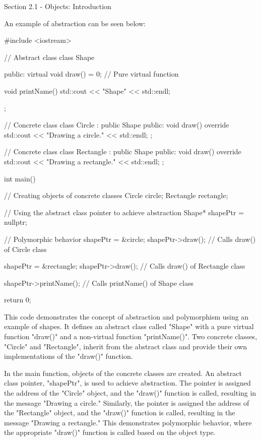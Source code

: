 \begin{notes}{Section 2.1 - Objects: Introduction}
    \begin{highlight}
        An example of abstraction can be seen below:
    \begin{code}[C++]
    #include <iostream>

    // Abstract class
    class Shape {
    public:
        virtual void draw() = 0;  // Pure virtual function
        
        void printName() {
            std::cout << "Shape" << std::endl;
        }
    };

    // Concrete class
    class Circle : public Shape {
    public:
        void draw() override {
            std::cout << "Drawing a circle." << std::endl;
        }
    };

    // Concrete class
    class Rectangle : public Shape {
    public:
        void draw() override {
            std::cout << "Drawing a rectangle." << std::endl;
        }
    };

    int main() {
        // Creating objects of concrete classes
        Circle circle;
        Rectangle rectangle;
        
        // Using the abstract class pointer to achieve abstraction
        Shape* shapePtr = nullptr;
        
        // Polymorphic behavior
        shapePtr = &circle;
        shapePtr->draw();  // Calls draw() of Circle class
        
        shapePtr = &rectangle;
        shapePtr->draw();  // Calls draw() of Rectangle class
        
        shapePtr->printName();  // Calls printName() of Shape class
        
        return 0;
    }
    \end{code}
        This code demonstrates the concept of abstraction and polymorphism using an example of shapes. It defines an abstract class called "Shape" with a pure virtual function "draw()" and a non-virtual function "printName()". Two concrete classes, 
        "Circle" and "Rectangle", inherit from the abstract class and provide their own implementations of the "draw()" function.
    
        In the main function, objects of the concrete classes are created. An abstract class pointer, "shapePtr", is used to achieve abstraction. The pointer is assigned the address of the "Circle" object, and the "draw()" function is called, resulting
        in the message "Drawing a circle." Similarly, the pointer is assigned the address of the "Rectangle" object, and the "draw()" function is called, resulting in the message "Drawing a rectangle." This demonstrates polymorphic behavior, where the
        appropriate "draw()" function is called based on the object type.
    

\end{highlight}
\end{notes}
